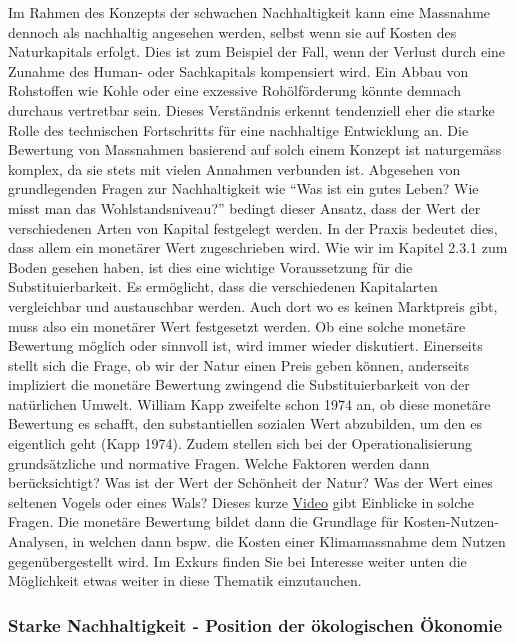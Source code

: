 \documentclass[
  nswissgerman,
  a4paper,
  DIV=11,
  numbers=noendperiod,
  oneside,
  openany]{scrreprt}
\begin{document}
Im Rahmen des Konzepts der schwachen Nachhaltigkeit kann eine Massnahme
dennoch als nachhaltig angesehen werden, selbst wenn sie auf Kosten des
Naturkapitals erfolgt. Dies ist zum Beispiel der Fall, wenn der Verlust
durch eine Zunahme des Human- oder Sachkapitals kompensiert wird. Ein
Abbau von Rohstoffen wie Kohle oder eine exzessive Rohölförderung könnte
demnach durchaus vertretbar sein. Dieses Verständnis erkennt tendenziell
eher die starke Rolle des technischen Fortschritts für eine nachhaltige
Entwicklung an. Die Bewertung von Massnahmen basierend auf solch einem
Konzept ist naturgemäss komplex, da sie stets mit vielen Annahmen
verbunden ist. Abgesehen von grundlegenden Fragen zur Nachhaltigkeit wie
``Was ist ein gutes Leben? Wie misst man das Wohlstandsniveau?'' bedingt
dieser Ansatz, dass der Wert der verschiedenen Arten von Kapital
festgelegt werden. In der Praxis bedeutet dies, dass allem ein monetärer
Wert zugeschrieben wird. Wie wir im Kapitel 2.3.1 zum Boden gesehen
haben, ist dies eine wichtige Voraussetzung für die Substituierbarkeit.
Es ermöglicht, dass die verschiedenen Kapitalarten vergleichbar und
austauschbar werden. Auch dort wo es keinen Marktpreis gibt, muss also
ein monetärer Wert festgesetzt werden. Ob eine solche monetäre Bewertung
möglich oder sinnvoll ist, wird immer wieder diskutiert. Einerseits
stellt sich die Frage, ob wir der Natur einen Preis geben können,
anderseits impliziert die monetäre Bewertung zwingend die
Substituierbarkeit von der natürlichen Umwelt. William Kapp zweifelte
schon 1974 an, ob diese monetäre Bewertung es schafft, den
substantiellen sozialen Wert abzubilden, um den es eigentlich geht (Kapp
1974). Zudem stellen sich bei der Operationalisierung grundsätzliche und
normative Fragen. Welche Faktoren werden dann berücksichtigt? Was ist
der Wert der Schönheit der Natur? Was der Wert eines seltenen Vogels
oder eines Wals? Dieses kurze
\href{https://www.youtube.com/watch?v=MSxIBYOMQOU}{Video} gibt Einblicke
in solche Fragen. Die monetäre Bewertung bildet dann die Grundlage für
Kosten-Nutzen-Analysen, in welchen dann bspw. die Kosten einer
Klimamassnahme dem Nutzen gegenübergestellt wird. Im Exkurs finden Sie
bei Interesse weiter unten die Möglichkeit etwas weiter in diese
Thematik einzutauchen.

\subsubsection{Starke Nachhaltigkeit - Position der ökologischen
Ökonomie}\label{starke-nachhaltigkeit---position-der-uxf6kologischen-uxf6konomie}
\end{document}
